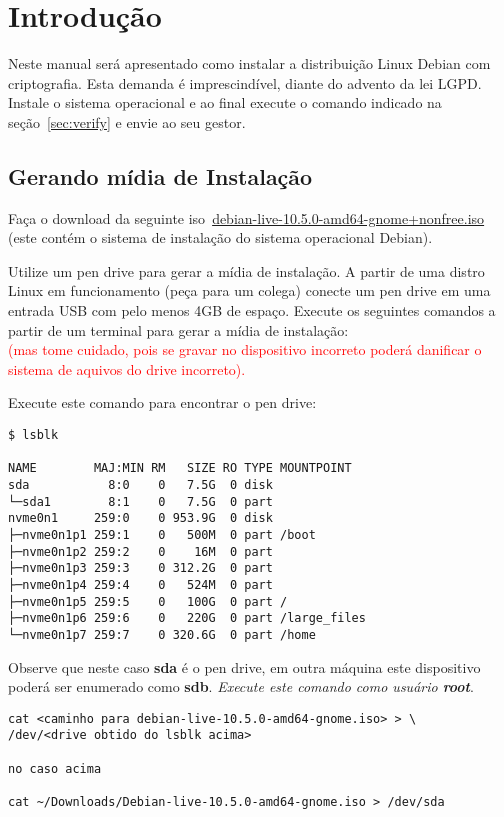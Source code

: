 \section{Introdução} \label{sec:intro}
Neste manual será apresentado como instalar a distribuição Linux
Debian com criptografia. Esta demanda é imprescindível, diante do
advento da lei LGPD. Instale o sistema operacional e ao final execute
o comando indicado na seção~\ref{sec:verify} e envie ao seu gestor.

\subsection{Gerando mídia de Instalação} \label{subsec:gen}
Faça o download da seguinte
iso~\href{https://cdimage.debian.org/cdimage/unofficial/non-free/cd-including-firmware/10.5.0-live+nonfree/amd64/iso-hybrid/debian-live-10.5.0-amd64-gnome+nonfree.iso}{debian-live-10.5.0-amd64-gnome+nonfree.iso}
(este contém o sistema de instalação do sistema operacional Debian).

Utilize um pen drive para gerar a mídia de instalação. A partir de uma
distro Linux em funcionamento (peça para um colega) conecte um pen
drive em uma entrada USB com pelo menos 4GB de espaço. Execute os
seguintes comandos a partir de um terminal para gerar a mídia de instalação:\\

\textcolor{red}{(mas tome cuidado,
pois se gravar no dispositivo incorreto poderá danificar o sistema de
aquivos do drive incorreto).}

Execute este comando para encontrar o pen drive:
\begin{verbatim}
$ lsblk

NAME        MAJ:MIN RM   SIZE RO TYPE MOUNTPOINT
sda           8:0    0   7.5G  0 disk
└─sda1        8:1    0   7.5G  0 part 
nvme0n1     259:0    0 953.9G  0 disk 
├─nvme0n1p1 259:1    0   500M  0 part /boot
├─nvme0n1p2 259:2    0    16M  0 part 
├─nvme0n1p3 259:3    0 312.2G  0 part 
├─nvme0n1p4 259:4    0   524M  0 part 
├─nvme0n1p5 259:5    0   100G  0 part /
├─nvme0n1p6 259:6    0   220G  0 part /large_files
└─nvme0n1p7 259:7    0 320.6G  0 part /home
\end{verbatim}

Observe que neste caso \textbf{sda} é o pen drive, em outra máquina este
dispositivo poderá ser enumerado como \textbf{sdb}. \emph{Execute este
comando como usuário \textbf{root}}.

\begin{verbatim}
cat <caminho para debian-live-10.5.0-amd64-gnome.iso> > \
/dev/<drive obtido do lsblk acima>

no caso acima

cat ~/Downloads/Debian-live-10.5.0-amd64-gnome.iso > /dev/sda
\end{verbatim}

